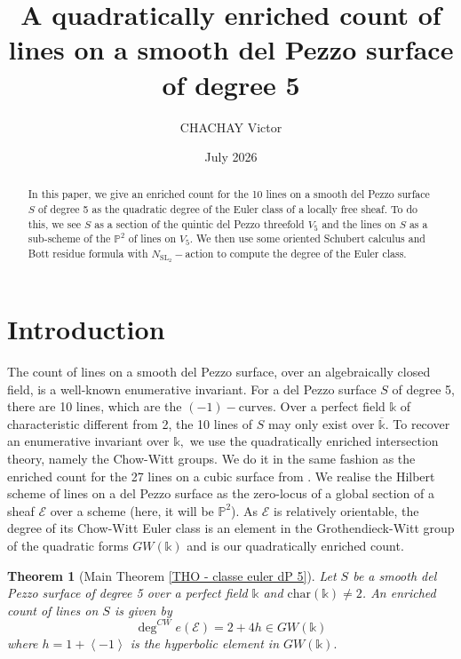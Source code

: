 \documentclass{amsart}
\title{A quadratically enriched count of lines on a smooth del Pezzo surface of degree 5}
\author{CHACHAY Victor} %
\date{July 2026}
\theoremstyle{plain}%
\newtheorem{thintro}[subsection]{Theorem}
\theoremstyle{remark}
\theoremstyle{definition}
\newcommand{\cE}{\mathcal{E}}
\newcommand{\ek}{\mathbb{k}}
\newcommand{\eP}{\mathbb{P}}
\newcommand{\GW}{GW}
\newcommand{\qscal}[1]{\left\langle #1 \right\rangle}
\newcommand{\SL}{\operatorname{SL}}
\begin{document}
\begin{abstract}
In this paper, we give an enriched count for the 10 lines on a smooth del Pezzo surface $S$ of degree 5 as the quadratic degree of the Euler class of a locally free sheaf. To do this, we see $S$ as a section of the quintic del Pezzo threefold $V_5$ and the lines on $S$ as a sub-scheme of the $\eP^2$ of lines on $V_5.$ We then use some oriented Schubert calculus and Bott residue formula with $N_{\SL_2}-$action to compute the degree of the Euler class.
\end{abstract}

\maketitle

\tableofcontents


\section{Introduction}
 

The count of lines on a smooth del Pezzo surface, over an algebraically closed field, is a well-known enumerative invariant. For a del Pezzo surface $S$ of degree 5, there are 10 lines, which are the $(-1)-$curves. Over a perfect field $\ek$ of characteristic different from 2, the 10 lines of $S$ may only exist over $\overline{\ek}.$ To recover an enumerative invariant over $\ek,$ we use the quadratically enriched intersection theory, namely the Chow-Witt groups. We do it in the same fashion as the enriched count for the 27 lines on a cubic surface from \cite{Kass_Wickelgren}. We realise the Hilbert scheme of lines on a del Pezzo surface as the zero-locus of a global section of a sheaf $\cE$ over a scheme (here, it will be $\eP^2$). As $\cE$ is relatively orientable, the degree of its Chow-Witt Euler class is an element in the Grothendieck-Witt group of the quadratic forms $\GW(\ek)$ and is our quadratically enriched count. 

\begin{thintro}[Main Theorem \ref{THO - classe euler dP 5}]
Let $S$ be a smooth del Pezzo surface of degree 5 over a perfect field $\ek$ and $\mathrm{char}(\ek) \neq 2$. An enriched count of lines on $S$ is given by
\[\deg^{CW} e(\cE) = 2 + 4h \in \GW(\ek)\]
where $h = 1 + \qscal{-1}$ is the hyperbolic element in $\GW(\ek).$
\end{thintro}
\end{document}
